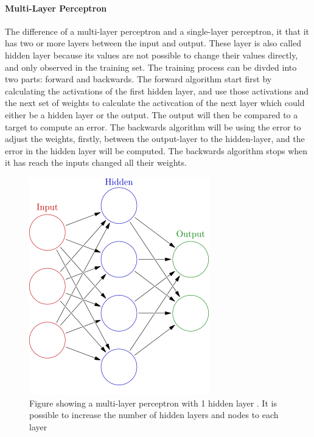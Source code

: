 \documentclass[USenglish]{ifimaster}  %
\begin{document}
\paragraph{Multi-Layer Perceptron}
The difference of a multi-layer perceptron and a single-layer perceptron, it that it has two or more layers between the input and output. These layer is also called hidden layer because its values are not possible to change their values directly, and only observed in the training set. The training process can be divded into two parts: forward and backwards. The forward algorithm start first by calculating the activations of the first hidden layer, and use those activations and the next set of weights to calculate the activcation of the next layer which could either be a hidden layer or the output. The output will then be compared to a target to compute an error. The backwards algorithm will be using the error to adjust the weights, firstly, between the output-layer to the hidden-layer, and the error in the hidden layer will be computed. The backwards algorithm stops when it has reach the inputs changed all their weights.


\begin{figure}[h]
    \centering
    \includegraphics[scale=0.6]{Figures/MLP.png}
    \caption{Figure showing a multi-layer perceptron with 1 hidden layer \cite{MLP}. It is possible to increase the number of hidden layers and nodes to each layer}
    \label{fig:MLP}
\end{figure}
\end{document}
